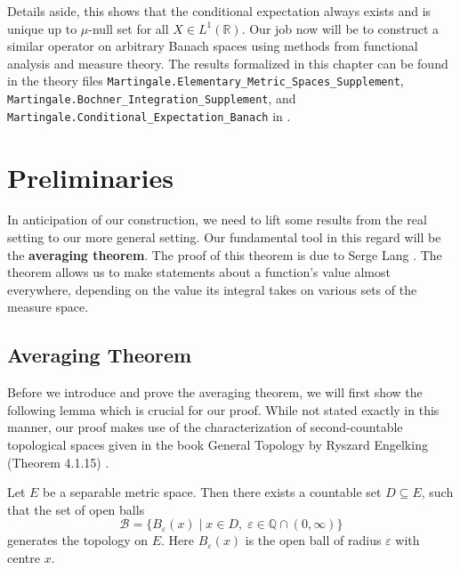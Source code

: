 Details aside, this shows that the conditional expectation always exists and is unique up to $\mu$-null set for all $X \in L^1(\mathbb{R})$. Our job now will be to construct a similar operator on arbitrary Banach spaces using methods from functional analysis and measure theory. The results formalized in this chapter can be found in the theory files \texttt{Martingale.Elementary\_Metric\_Spaces\_Supplement}, \;\texttt{Martingale.Bochner\_Integra\-tion\_Supplement}, and \texttt{Martingale.Conditional\_Expectation\_Banach} in \cite{Keskin_A_Formalization_of_2023}.

\section{Preliminaries}

In anticipation of our construction, we need to lift some results from the real setting to our more general setting. Our fundamental tool in this regard will be the \textbf{averaging theorem}. The proof of this theorem is due to Serge Lang \cite{Lang_1993}. The theorem allows us to make statements about a function's value almost everywhere, depending on the value its integral takes on various sets of the measure space.

\subsection{Averaging Theorem}

Before we introduce and prove the averaging theorem, we will first show the following lemma which is crucial for our proof. While not stated exactly in this manner, our proof makes use of the characterization of second-countable topological spaces given in the book General Topology by Ryszard Engelking (Theorem 4.1.15) \cite{engelking_1989}.

\begin{lemma}
Let $E$ be a separable metric space. Then there exists a countable set $D \subseteq E$, such that the set of open balls
\[
	\mathcal{B} = \{ B_\varepsilon(x) \; \vert \; x \in D, \; \varepsilon \in \mathbb{Q} \cap (0, \infty) \}
\]
generates the topology on $E$. Here $B_\varepsilon(x)$ is the open ball of radius $\varepsilon$ with centre $x$.
\end{lemma}

